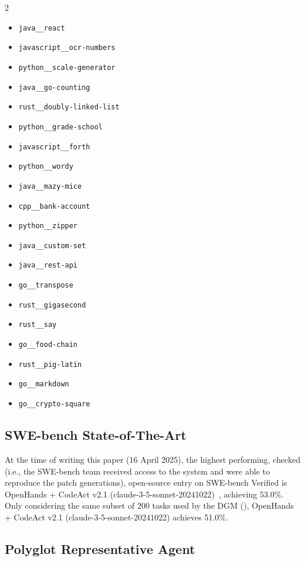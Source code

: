 \documentclass{article} %
\begin{document}
\begin{multicols}{2}
\begin{itemize}
    \item \texttt{java\_\_react}
    \item \texttt{javascript\_\_ocr-numbers}
    \item \texttt{python\_\_scale-generator}
    \item \texttt{java\_\_go-counting}
    \item \texttt{rust\_\_doubly-linked-list}
    \item \texttt{python\_\_grade-school}
    \item \texttt{javascript\_\_forth}
    \item \texttt{python\_\_wordy}
    \item \texttt{java\_\_mazy-mice}
    \item \texttt{cpp\_\_bank-account}
    \item \texttt{python\_\_zipper}
    \item \texttt{java\_\_custom-set}
    \item \texttt{java\_\_rest-api}
    \item \texttt{go\_\_transpose}
    \item \texttt{rust\_\_gigasecond}
    \item \texttt{rust\_\_say}
    \item \texttt{go\_\_food-chain}
    \item \texttt{rust\_\_pig-latin}
    \item \texttt{go\_\_markdown}
    \item \texttt{go\_\_crypto-square}
\end{itemize}
\end{multicols}


\subsection{SWE-bench State-of-The-Art}
\label{app:swebench-sota}
At the time of writing this paper (16 April 2025), the highest performing, checked (i.e., the SWE-bench team received access to the system and were able to reproduce the patch generations), open-source entry on SWE-bench Verified is OpenHands + CodeAct v2.1 (claude-3-5-sonnet-20241022)~\citep{wang2024openhands}, achieving 53.0\%. Only considering the same subset of 200 tasks used by the DGM (), OpenHands + CodeAct v2.1 (claude-3-5-sonnet-20241022) achieves 51.0\%.

\subsection{Polyglot Representative Agent}
\label{app:polyglot-sota}
\end{document}
